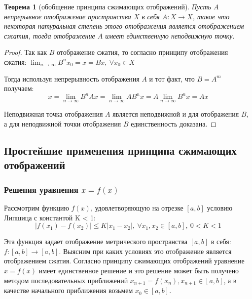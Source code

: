 \documentclass[14pt,a4paper]{extarticle}
\newtheorem{theorem}{Теорема}[section]
\theoremstyle{definition}
\theoremstyle{remark}
\renewcommand{\[}{\begin{dmath*}[compact]}
\renewcommand{\]}{\end{dmath*}}
\newcommand{\ds}{\displaystyle}
\newcommand{\sep}{ , \ \allowbreak }
\begin{document}
\begin{theorem}[обобщение принципа сжимающих отображений]
  Пусть $A$ непрерывное отображение пространства $X$ в себя $A: X\to X$, такое
  что некоторая натуральная степень этого отображения является отображением
  сжатия, тогда отображение $A$ имеет единственную неподвижную точку.
\end{theorem}

\begin{proof}
  Так как $B$ отображение сжатия, то согласно принципу отображения сжатия:
  $\ds {\lim_{n\to \infty}B^{n}x_{0}=x=Bx}\sep{\forall x_{0}\in X}$

  Тогда используя непрерывность отображения $A$ и тот факт,
  что $B=A^{m}$ получаем:
  \[ x = \lim_{n\to \infty}B^{n}Ax =
  \lim_{n\to \infty}AB^{n}x =
  A\lim_{n\to \infty}B^{n}x = Ax\]

  Неподвижная точка отображения $A$ является неподвижной и для отображения $B$,
  а для неподвижной точки отображения $B$ единственность доказана.
\end{proof}

\subsection{Простейшие применения принципа сжимающих отображений}

\subsubsection{Решения уравнения \texorpdfstring{$x=f(x)$}{Lg}}

Рассмотрим функцию $f(x)$, удовлетворяющую на отрезке $[a, b]$ условию Липшица
с константой K < 1:
\[ |f(x_1)-f(x_2)|\leq K|x_1-x_2|\sep{\forall x_1, x_2 \in [a, b]} \sep
{0<K<1}\]

Эта функция задает отображение метрического пространства $[a, b]$ в себя:
$f:[a,b] \to[a, b]$.
Выясним при каких условиях это отображение является отображением сжатия.
Согласно принципу сжимающих отображений уравнение $x=f(x)$ имеет
единственное решение и это решение может быть получено
методом последовательных приближений $x_{n+1}=f(x_n), x_{n+1} \in [a, b]$,
а в качестве начального приближения возьмем $x_0 \in [a, b]$.
\end{document}
